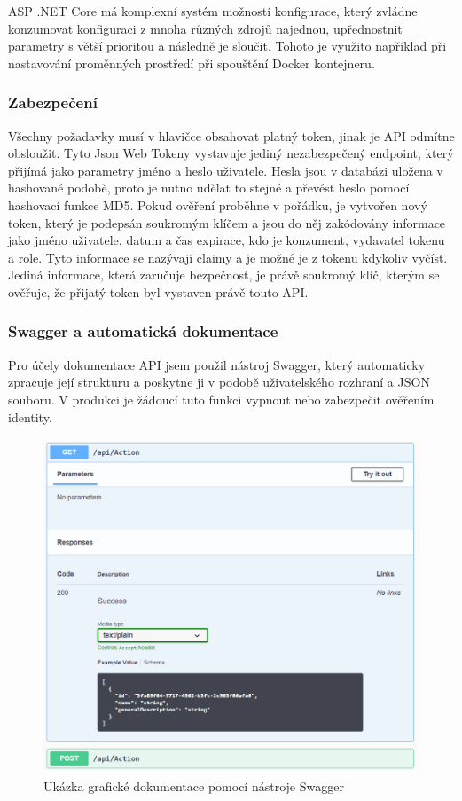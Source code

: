 \documentclass[
  biblatex,
  glossaries,
  index
]{kidiplom}
\begin{document}
ASP .NET Core má komplexní systém možností konfigurace, který zvládne konzumovat konfiguraci z mnoha různých zdrojů najednou, upřednostnit parametry s větší prioritou a následně je sloučit. Tohoto je využito například při nastavování proměnných prostředí při spouštění Docker kontejneru.

\subsubsection{Zabezpečení}
Všechny požadavky musí v hlavičce obsahovat platný token, jinak je API odmítne obsloužit. Tyto Json Web Tokeny vystavuje jediný nezabezpečený endpoint, který přijímá jako parametry jméno a heslo uživatele. Hesla jsou v databázi uložena v hashované podobě, proto je nutno udělat to stejné a převést heslo pomocí hashovací funkce MD5. Pokud ověření proběhne v pořádku, je vytvořen nový token, který je podepsán soukromým klíčem a jsou do něj zakódovány informace jako jméno uživatele, datum a čas expirace, kdo je konzument, vydavatel tokenu a role. Tyto informace se nazývají claimy a je možné je z tokenu kdykoliv vyčíst. Jediná informace, která zaručuje bezpečnost, je právě soukromý klíč, kterým se ověřuje, že přijatý token byl vystaven právě touto API.

\subsubsection{Swagger a automatická dokumentace}
Pro účely dokumentace API jsem použil nástroj Swagger, který automaticky zpracuje její strukturu a poskytne ji v podobě uživatelského rozhraní a JSON souboru. V produkci je žádoucí tuto funkci vypnout nebo zabezpečit ověřením identity.

\begin{figure}[H]
  	\centering
 	 \includegraphics[width=14cm,height=10cm,keepaspectratio]{Swagger_UI}
 	 \caption{Ukázka grafické dokumentace pomocí nástroje Swagger}
\end{figure}
\end{document}
